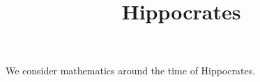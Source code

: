 \documentclass{ximera}
\title{Hippocrates}
\begin{document}
\begin{abstract}
\end{abstract}
\maketitle

We consider mathematics around the time of Hippocrates.
\end{document}
